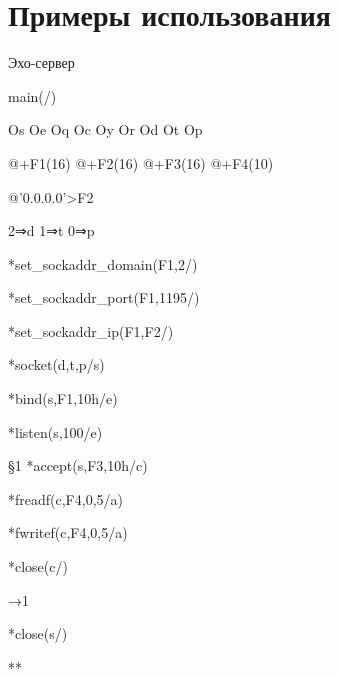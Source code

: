 \documentclass[12t,english,russian]{article}
\begin{document}
\section[Примеры использования]{Примеры использования}
\begin{center}
\textcolor[rgb]{1,0,0}{Эхо-сервер}
\end{center}

main(/)

	Os Oe Oq Oc Oy Or Od Ot Op

	@+F1(16) @+F2(16) @+F3(16) @+F4(10)

	@'0.0.0.0'>F2

	2⇒d 1⇒t 0⇒p

	*set\_sockaddr\_domain(F1,2/)

	*set\_sockaddr\_port(F1,1195/)

	*set\_sockaddr\_ip(F1,F2/)

	*socket(d,t,p/s)

	*bind(s,F1,10h/e)

	*listen(s,100/e)

§1	*accept(s,F3,10h/c)

	*freadf(c,F4,0,5/a)
	
	*fwritef(c,F4,0,5/a)
	
	*close(c/)
	
	→1
	
	*close(s/)
	
	**
\end{document}
